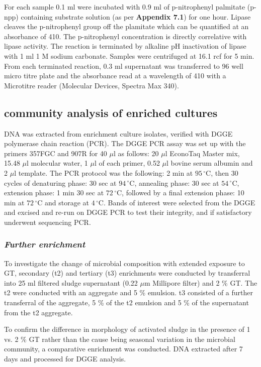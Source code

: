 \documentclass[11pt]{article}
\begin{document}
For each sample 0.1 ml were incubated with 0.9 ml of  p-nitrophenyl palmitate (p-npp) containing substrate solution (as per \textbf{Appendix 7.1}) for one hour. Lipase cleaves the p-nitrophenyl group off the plamitate which can be quantified at an absorbance of 410. The p-nitrophenyl concentration is directly correlative with lipase activity. The reaction is terminated by alkaline pH inactivation of lipase with 1 ml 1 M sodium carbonate. Samples were centrifuged at 16.1 rcf for 5 min. From each terminated reaction, 0.3 ml supernatant was transferred to 96 well micro titre plate and the absorbance read at a wavelength of 410 with a Microtitre reader (Molecular Devices, Spectra Max 340).
\FloatBarrier
\subsection{community analysis of enriched cultures}
DNA was extracted from enrichment culture isolates, verified with DGGE polymerase chain reaction (PCR). The DGGE PCR assay was set up with the primers 357FGC and 907R for 40 $\mu$l as follows: 20 $\mu$l EconoTaq Master mix, 15.48 $\mu$l molecular water, 1 $\mu$l of each primer, 0.52 $\mu$l bovine serum albumin and 2 $\mu$l template. The PCR protocol was the following: 2 min at $95\,^{\circ}\mathrm{C}$, then 30 cycles of denaturing phase: 30 sec at $94\,^{\circ}\mathrm{C}$, annealing phase: 30 sec at  $54\,^{\circ}\mathrm{C}$, extension phase: 1 min 30 sec at $72\,^{\circ}\mathrm{C}$, followed by a final extension phase: 10 min at $72\,^{\circ}\mathrm{C}$ and storage at $4\,^{\circ}\mathrm{C}$.
Bands of interest were selected from the DGGE and excised and re-run on DGGE PCR to test their integrity, and if satisfactory underwent sequencing PCR. 

\subsubsection{\emph{Further enrichment}}
To investigate the change of microbial composition with extended exposure to GT, secondary (t2) and tertiary (t3) enrichments were conducted by transferral into 25 ml filtered sludge supernatant (0.22 $\mu$m Millipore filter) and 2 \% GT. The t2 were conducted with an aggregate and 5 \% emulsion. t3 consisted of a further transferral of the aggregate, 5 \% of the t2 emulsion and 5 \% of the supernatant from the t2 aggregate.

To confirm the difference in morphology of activated sludge in the presence of 1 vs. 2 \% GT rather than the cause being seasonal variation in the microbial community, a comparative enrichment was conducted. DNA extracted after 7 days and processed for DGGE analysis.
 
\end{document}
